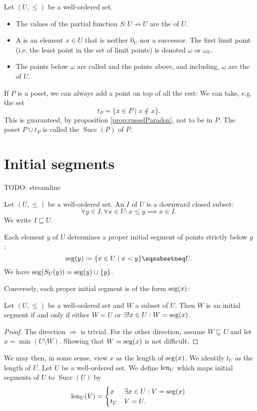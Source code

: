 \begin{definition}
Let $(U,\leq)$ be a well-ordered set.
\begin{itemize}
\item The values of the partial function $S: U\not\to U$ are the  of $U$.
\item A  is an element $x\in U$ that is neither $0_U$ nor a successor. The first limit point (i.e. the least point in the set of limit points) is denoted $\omega$ or $\omega_U$.
\item The points below $\omega$ are called  and the points above, and including, $\omega$ are the  of $U$.
\end{itemize}
\end{definition}

If $P$ is a poset, we can always add a point on top of all the rest: We can take, e.g. the set
\[ t_P = \{ x\in P\;|\;x\notin x \}. \]
This is guaranteed, by proposition \ref{prop:russelParadox}, not to be in $P$.
The poset $P\cup t_P$ is called the  $\operatorname{Succ}(P)$ of $P$.

\section{Initial segments}
TODO: streamline
\begin{definition}
Let $(U,\leq)$ be a well-ordered set. An  $I$ of $U$ is a downward closed subset:
\[ \forall y\in I: \forall x\in U: x\leq y \implies x\in I. \]
We write $I \sqsubseteq U$.
\end{definition}
Each element $y$ of $U$ determines a proper initial segment of points strictly below $y$:
\[ \seg(y) \defeq \{ x\in U\;|\; x < y \} \sqsubsetneq U. \]
We have $\operatorname{seg}(S_U(y)) = \operatorname{seg}(y)\cup\{y\}$.

Conversely, each proper initial segment is of the form $\operatorname{seg}(x)$:
\begin{proposition}
Let $(U,\leq)$ be a well-ordered set and $W$ a subset of $U$. Then $W$ is an initial segment \textup{if and only if} either $W=U$ or $\exists! x\in U: W = \operatorname{seg}(x)$.
\end{proposition}
\begin{proof}
The direction $\Rightarrow$ is trivial. For the other direction, assume $W \sqsubsetneq U$ and let $x= \min(U\setminus W)$. Showing that $W=\operatorname{seg}(x)$ is not difficult.
\end{proof}
We may then, in some sense, view $x$ as the length of $\operatorname{seg}(x)$. We identify $t_U$ as the length of $U$. Let $U$ be a well-ordered set. We define $\operatorname{len}_U$ which maps initial segments of $U$ to $\operatorname{Succ}(U)$ by
\[ \operatorname{len}_U(V) = \begin{cases}
x & \exists x\in U: V=\operatorname{seg}(x) \\
t_U & V = U.
\end{cases} \]


